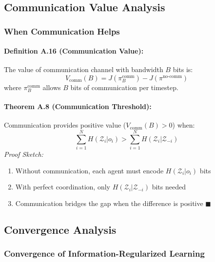 \documentclass[10pt, letterpaper]{article}
\begin{document}
\subsection{Communication Value Analysis}

\subsubsection{When Communication Helps}

\paragraph{Definition A.16 (Communication Value):} The value of communication channel with bandwidth $B$ bits is:
\[V_{\text{comm}}(B) = J(\pi^{\text{comm}}_B) - J(\pi^{\text{no-comm}})\]
where $\pi^{\text{comm}}_B$ allows $B$ bits of communication per timestep.

\paragraph{Theorem A.8 (Communication Threshold):} Communication provides positive value ($V_{\text{comm}}(B) > 0$) when:
\[\sum_{i=1}^N H(\mathcal{Z}_i | o_i) > \sum_{i=1}^N H(\mathcal{Z}_i | \mathcal{Z}_{-i})\]
\emph{Proof Sketch:}
\begin{enumerate}
    \item Without communication, each agent must encode $H(\mathcal{Z}_i | o_i)$ bits
    \item With perfect coordination, only $H(\mathcal{Z}_i | \mathcal{Z}_{-i})$ bits needed
    \item Communication bridges the gap when the difference is positive $\blacksquare$
\end{enumerate}

\subsection{Convergence Analysis}

\subsubsection{Convergence of Information-Regularized Learning}
\end{document}
